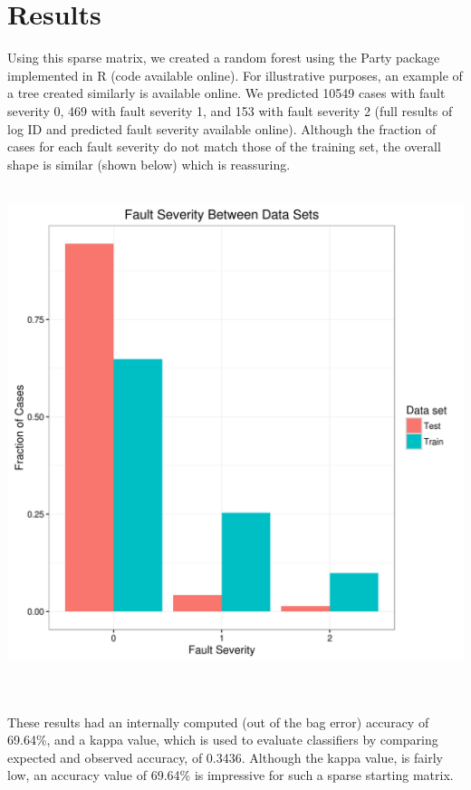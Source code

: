 \documentclass[11pt]{article} %
\begin{document}
\section*{Results}
Using this sparse matrix, we created a random forest using the Party package implemented in R (code available online). For illustrative purposes, an example of a tree created similarly is available online. We predicted 10549 cases with fault severity 0, 469 with fault severity 1, and 153 with fault severity 2 (full results of log ID and predicted fault severity available online). Although the fraction of cases for each fault severity do not match those of the training set, the overall shape is similar (shown below) which is reassuring.\\\\
\begin{centering}\includegraphics[scale=0.6]{Data/p_comp_frac.png}\end{centering}\\\\
These results had an internally computed (out of the bag error) accuracy of 69.64\%, and a kappa value, which is used to evaluate classifiers by comparing expected and observed accuracy, of 0.3436. Although the kappa value, is fairly low, an accuracy value of 69.64\% is impressive for such a sparse starting matrix.
\end{document}
